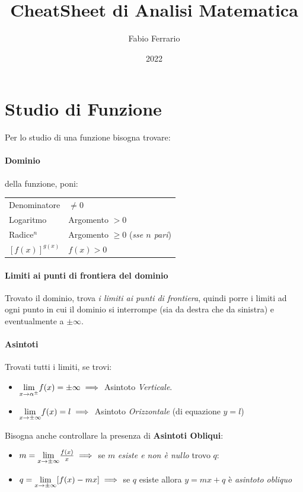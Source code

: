 \documentclass[12pt, a4paper]{article}
\begin{document}
\title{CheatSheet di Analisi Matematica}
\author{Fabio Ferrario}
\date{2022}
\maketitle
\section*{Studio di Funzione}
Per lo studio di una funzione bisogna trovare:
\paragraph*{Dominio} della funzione, poni:\\

\begin{tabular}{ l|l }
	Denominatore    & $\neq 0$                                 \\
	Logaritmo       & Argomento $>0$                           \\
	Radice$^n$      & Argomento $\geq 0$ (\emph{sse $n$ pari}) \\
	$[f(x)]^{g(x)}$ & $f(x)>0$
\end{tabular}
\paragraph*{Limiti ai punti di frontiera del dominio}
Trovato il dominio, trova \emph{i limiti ai punti di frontiera},
quindi porre i limiti ad ogni punto in cui il dominio si interrompe (sia da destra che da sinistra) e eventualmente a $\pm \infty$.
\paragraph*{Asintoti}
Trovati tutti i limiti, se trovi:
\begin{itemize}
	\item $\underset{x \to \alpha^\pm}{\lim} f(x) = \pm \infty \implies$ Asintoto \emph{Verticale}.
	\item $\underset{x \to \pm \infty}{\lim} f(x) = l \implies$ Asintoto \emph{Orizzontale} (di equazione $y=l$)
\end{itemize}
Bisogna anche controllare la presenza di \textbf{Asintoti Obliqui}:
\begin{itemize}
	\item $m = \underset{x \to \pm \infty}{\lim} \frac{f(x)}{x} \implies$ se $m$ \emph{esiste e non è nullo} trovo $q$:
	\item $q = \underset{x \to \pm \infty}{\lim} [f(x) - mx]\implies$  se $q$ esiste allora $y=mx+q$ è \emph{asintoto obliquo}
\end{itemize}
\end{document}
